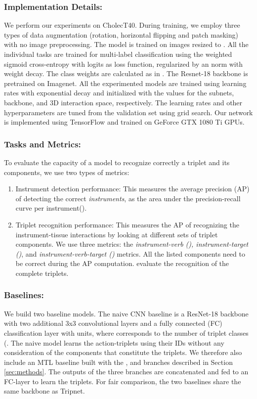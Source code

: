 \documentclass[english,runningheads,a4paper]{llncs}
\begin{document}
\subsubsection{Implementation Details: }
We perform our experiments on CholecT40. 
During training, we employ three types of data augmentation (rotation, horizontal flipping and patch masking) with no image preprocessing.
The model is trained on images resized to . 
All the individual tasks are trained for multi-label classification using the weighted sigmoid cross-entropy with logits as loss function, regularized by an  norm with  weight decay.
The class weights are calculated as in \cite{nwoye_convlstm_ijcars2019}.
The Resnet-18 backbone is pretrained on Imagenet. All the experimented models are trained using learning rates with exponential decay and initialized with the values  for the subnets, backbone, and 3D interaction space, respectively.
The learning rates and other hyperparameters are tuned from the validation set using grid search.
Our network is implemented using TensorFlow and trained on GeForce GTX 1080 Ti GPUs.


\subsubsection{Tasks and Metrics: }
To evaluate the capacity of a model to recognize correctly a triplet and its components, we use two types of metrics:
\begin{enumerate}
    \item {Instrument detection performance:}
    This measures the average precision (AP) of detecting the correct \textit{instruments}, as the area under the precision-recall curve per instrument().
    \item {Triplet recognition performance:} 
    This measures the AP of recognizing the instrument-tissue interactions by looking at different sets of triplet components. We use three metrics: the \textit{instrument-verb (), instrument-target ()}, and \textit{instrument-verb-target ()} metrics. All the listed components need to be correct during the AP computation.  evaluate the recognition of the complete triplets. 
\end{enumerate}


\subsubsection{Baselines: }
We build two baseline models. The naive CNN baseline is a ResNet-18 backbone with two additional 3x3 convolutional layers and a fully connected (FC) classification layer with  units, where  corresponds to the number of triplet classes (. 
The naive model learns the action-triplets using their IDs without any consideration of the components that constitute the triplets. We therefore also include an MTL baseline built with the ,  and  branches described in Section \ref{sec:methods}. The outputs of the three branches are concatenated and fed to an FC-layer to learn the triplets.
For fair comparison, the two baselines share the same backbone as Tripnet.
\end{document}
